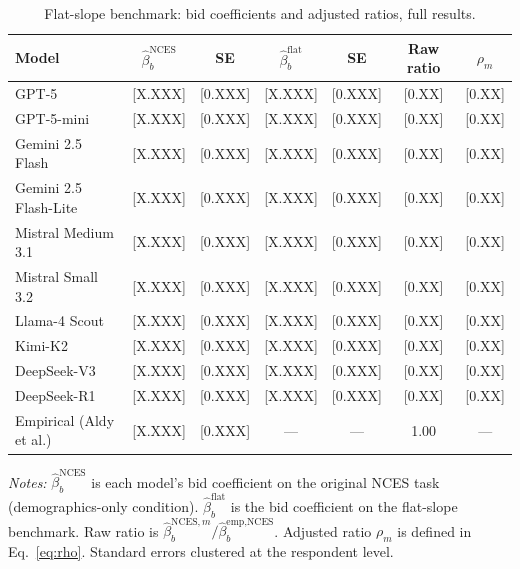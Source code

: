 \documentclass[12pt]{article}
\begin{document}
\begin{table}[h]
    \centering
    \caption{Flat-slope benchmark: bid coefficients and adjusted ratios, full results.}
    \label{tab:flat-slope-full}
    \begin{threeparttable}
    \footnotesize
    \begin{tabular}{lcccccc}
        \toprule
        Model & $\hat{\beta}_b^{\text{NCES}}$ & SE & $\hat{\beta}_b^{\text{flat}}$ & SE & Raw ratio & $\rho_m$ \\
        \midrule
        GPT-5                  & [X.XXX] & [0.XXX] & [X.XXX] & [0.XXX] & [0.XX] & [0.XX] \\
        GPT-5-mini             & [X.XXX] & [0.XXX] & [X.XXX] & [0.XXX] & [0.XX] & [0.XX] \\
        Gemini 2.5 Flash       & [X.XXX] & [0.XXX] & [X.XXX] & [0.XXX] & [0.XX] & [0.XX] \\
        Gemini 2.5 Flash-Lite  & [X.XXX] & [0.XXX] & [X.XXX] & [0.XXX] & [0.XX] & [0.XX] \\
        Mistral Medium 3.1     & [X.XXX] & [0.XXX] & [X.XXX] & [0.XXX] & [0.XX] & [0.XX] \\
        Mistral Small 3.2      & [X.XXX] & [0.XXX] & [X.XXX] & [0.XXX] & [0.XX] & [0.XX] \\
        Llama-4 Scout          & [X.XXX] & [0.XXX] & [X.XXX] & [0.XXX] & [0.XX] & [0.XX] \\
        Kimi-K2                & [X.XXX] & [0.XXX] & [X.XXX] & [0.XXX] & [0.XX] & [0.XX] \\
        DeepSeek-V3            & [X.XXX] & [0.XXX] & [X.XXX] & [0.XXX] & [0.XX] & [0.XX] \\
        DeepSeek-R1            & [X.XXX] & [0.XXX] & [X.XXX] & [0.XXX] & [0.XX] & [0.XX] \\
        \midrule
        Empirical (Aldy et al.)  & [X.XXX] & [0.XXX] & --- & --- & 1.00 & --- \\
        \bottomrule
    \end{tabular}
    \begin{tablenotes}\footnotesize
        \item \textit{Notes:} $\hat{\beta}_b^{\text{NCES}}$ is each model's bid coefficient on the original NCES task (demographics-only condition). $\hat{\beta}_b^{\text{flat}}$ is the bid coefficient on the flat-slope benchmark. Raw ratio is $\hat{\beta}_b^{\text{NCES}, m} / \hat{\beta}_b^{\text{emp,NCES}}$. Adjusted ratio $\rho_m$ is defined in Eq.~\ref{eq:rho}. Standard errors clustered at the respondent level.
    \end{tablenotes}
    \end{threeparttable}
\end{table}
\end{document}
